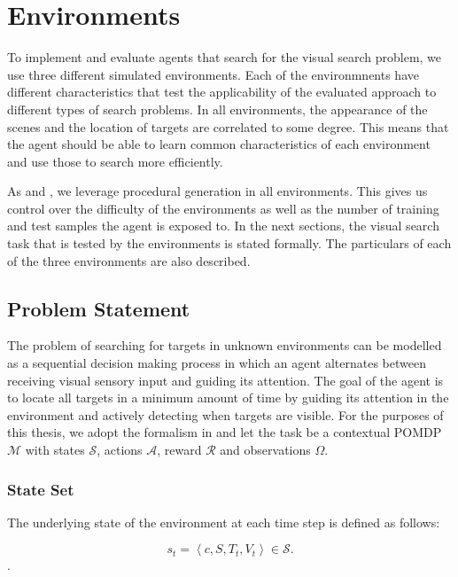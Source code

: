 \section{Environments}
\label{sec:environments}

To implement and evaluate agents that search for the visual search problem, we use three different simulated environments.
Each of the environmnents have different characteristics that test the applicability of the evaluated approach to different types of search problems.
In all environments, the appearance of the scenes and the location of targets are correlated to some degree.
This means that the agent should be able to learn common characteristics of each environment and use those to search more efficiently.

As \cite{cobbe_leveraging_2020} and \cite{mnih_asynchronous_2016}, we leverage procedural generation in all environments.
This gives us control over the difficulty of the environments as well as the number of training and test samples the agent is exposed to.
In the next sections, the visual search task that is tested by the environments is stated formally.
The particulars of each of the three environments are also described.

\subsection{Problem Statement}

The problem of searching for targets in unknown environments can be modelled as a sequential decision making process in which an agent alternates between receiving visual sensory input and guiding its attention.
The goal of the agent is to locate all targets in a minimum amount of time by guiding its attention in the environment and actively detecting when targets are visible.
For the purposes of this thesis, we adopt the formalism in \cite{kirk_survey_2022} and let the task be a contextual POMDP \(\mathcal{M}\) with states \(\mathcal{S}\), actions \(\mathcal{A}\), reward \(\mathcal{R}\) and observations \(\Omega\).

\subsubsection{State Set}

The underlying state of the environment at each time step is defined as follows:

\begin{equation}
    s_t = \left\langle c, S, T_t, V_t \right\rangle \in \mathcal{S}.
\end{equation}.

